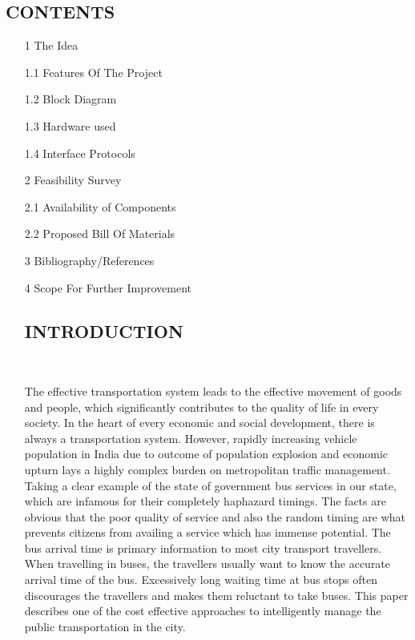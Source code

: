 \documentclass[12pt,a4paper,oneside]{report}
\begin{document}
\maketitle
\thispagestyle{empty}




\begin{onehalfspacing}




\section{CONTENTS}
\par
\hspace{.7cm}
\begin{enumerate}
\item[1]The Idea
\item[1.1]Features Of The Project
\item[1.2]Block Diagram
\item[1.3]Hardware used
\item[1.4]Interface Protocols
\item[2]Feasibility Survey
\item[2.1]Availability of Components
\item[2.2]Proposed Bill Of Materials
\item[3]Bibliography/References
\item[4]Scope For Further Improvement


\section{INTRODUCTION}



{$\;\;\;\;$}
  
  The effective transportation system leads to the effective movement of goods and people, which significantly contributes to the quality of life in every society. In the heart of every economic and social development, there is always a transportation system. However, rapidly increasing vehicle population in India due to outcome of population explosion and economic upturn lays a highly complex burden on metropolitan traffic management.
   Taking a clear example of the state of government bus services in our state, which are infamous for their completely haphazard timings. The facts are obvious that the poor quality of service and also the random timing are what prevents citizens from availing a service which has immense potential.
  The bus arrival time is primary information to most city transport travellers. When travelling in buses, the travellers usually want to know the accurate arrival time of the bus. Excessively long waiting time at bus stops often discourages the travellers and makes them reluctant to take buses.
  This paper describes  one of the cost effective approaches to intelligently manage the public transportation in the city.



\end{enumerate}
\end{onehalfspacing}
\end{document}
